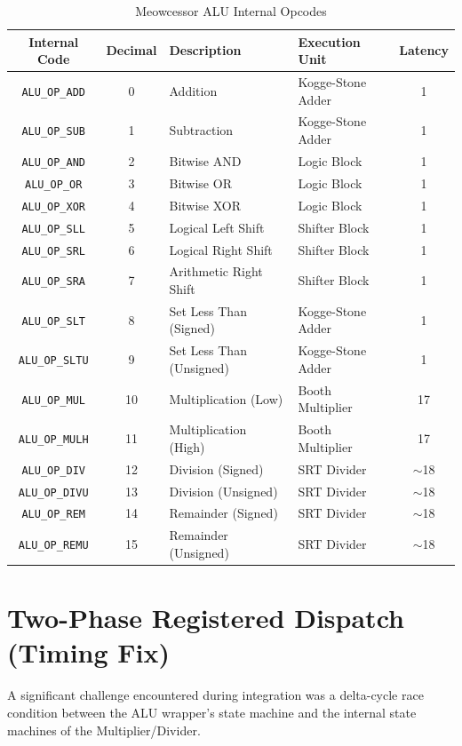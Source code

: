 \documentclass[12pt,a4paper]{article}
\begin{document}
\begin{table}[H]
    \centering
    \begin{tabularx}{\textwidth}{@{} c c X l c @{}}
        \toprule
        \textbf{Internal Code} & \textbf{Decimal} & \textbf{Description} & \textbf{Execution Unit} & \textbf{Latency} \\
        \midrule
        \texttt{ALU\_OP\_ADD}  & 0  & Addition & Kogge-Stone Adder & 1 \\
        \texttt{ALU\_OP\_SUB}  & 1  & Subtraction & Kogge-Stone Adder & 1 \\
        \texttt{ALU\_OP\_AND}  & 2  & Bitwise AND & Logic Block & 1 \\
        \texttt{ALU\_OP\_OR}   & 3  & Bitwise OR & Logic Block & 1 \\
        \texttt{ALU\_OP\_XOR}  & 4  & Bitwise XOR & Logic Block & 1 \\
        \texttt{ALU\_OP\_SLL}  & 5  & Logical Left Shift & Shifter Block & 1 \\
        \texttt{ALU\_OP\_SRL}  & 6  & Logical Right Shift & Shifter Block & 1 \\
        \texttt{ALU\_OP\_SRA}  & 7  & Arithmetic Right Shift & Shifter Block & 1 \\
        \texttt{ALU\_OP\_SLT}  & 8  & Set Less Than (Signed) & Kogge-Stone Adder & 1 \\
        \texttt{ALU\_OP\_SLTU} & 9  & Set Less Than (Unsigned) & Kogge-Stone Adder & 1 \\
        \texttt{ALU\_OP\_MUL}  & 10 & Multiplication (Low) & Booth Multiplier & 17 \\
        \texttt{ALU\_OP\_MULH} & 11 & Multiplication (High) & Booth Multiplier & 17 \\
        \texttt{ALU\_OP\_DIV}  & 12 & Division (Signed) & SRT Divider & $\sim$18 \\
        \texttt{ALU\_OP\_DIVU} & 13 & Division (Unsigned) & SRT Divider & $\sim$18 \\
        \texttt{ALU\_OP\_REM}  & 14 & Remainder (Signed) & SRT Divider & $\sim$18 \\
        \texttt{ALU\_OP\_REMU} & 15 & Remainder (Unsigned) & SRT Divider & $\sim$18 \\
        \bottomrule
    \end{tabularx}
    \caption{Meowcessor ALU Internal Opcodes}
\end{table}

\section{Two-Phase Registered Dispatch (Timing Fix)}
A significant challenge encountered during integration was a delta-cycle race condition between the ALU wrapper's state machine and the internal state machines of the Multiplier/Divider.
\end{document}

